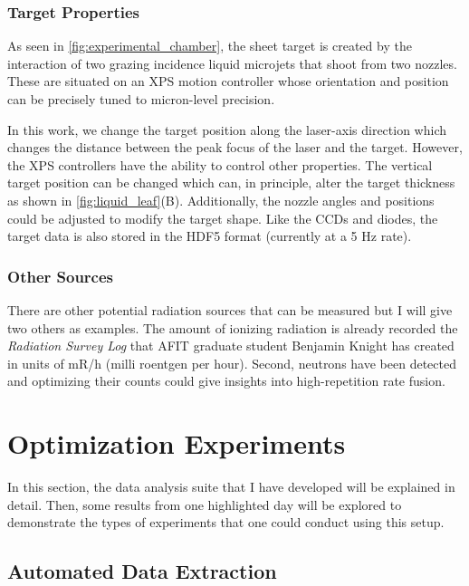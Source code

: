 \subsubsection{Target Properties}

As seen in \autoref{fig:experimental_chamber}, the sheet target is created by the interaction of two grazing incidence liquid microjets that shoot from two nozzles. These  are situated on an XPS motion controller whose orientation and position can be precisely tuned to micron-level precision. 

In this work, we change the target position along the laser-axis direction which changes the distance between the peak focus of the laser and the target. However, the XPS controllers have the ability to control other properties. The vertical target position can be changed which can, in principle, alter the target thickness as shown in \autoref{fig:liquid_leaf}(B). Additionally, the nozzle angles and positions could be adjusted to modify the target shape. Like the \gls{CCD}s and diodes, the target data is also stored in the \gls{HDF5} format (currently at a 5 Hz rate).

\subsubsection{Other Sources}
There are other potential radiation sources that can be measured but I will give two others as examples. The amount of ionizing radiation is already recorded the \emph{Radiation Survey Log} that AFIT graduate student Benjamin Knight has created in units of mR/h (milli roentgen per hour). Second, neutrons have been detected \cite{Knight_2024_HPLSE} and optimizing their counts could give insights into high-repetition rate fusion.

\section{Optimization Experiments}

In this section, the data analysis suite that I have developed will be explained in detail. Then, some results from one highlighted day will be explored to demonstrate the types of experiments that one could conduct using this setup.

\subsection{Automated Data Extraction}

